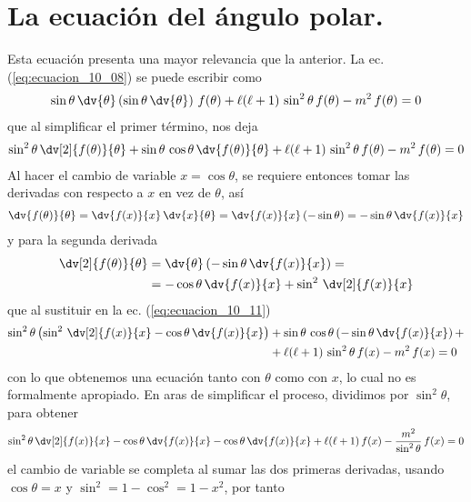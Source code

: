 \section{La ecuación del ángulo polar.}
Esta ecuación presenta una mayor relevancia que la anterior. La ec. (\ref{eq:ecuacion_10_08}) se puede escribir como
\begin{align*}
\sin \theta \, \dv{\theta} \left( \sin \theta \, \dv{\theta} \right) \, f(\theta) + \ell (\ell + 1) \, \sin^{2} \theta \, f(\theta) - m^{2} \, f(\theta) = 0
\end{align*}
que al simplificar el primer término, nos deja
\begin{align}
\sin^{2} \theta \, \dv[2]{f(\theta)}{\theta} + \sin \theta \, \cos \theta \, \dv{f(\theta)}{\theta} + \ell (\ell + 1) \, \sin^{2} \theta \, f(\theta) - m^{2} \, f(\theta) = 0
\label{eq:ecuacion_10_11}
\end{align}
Al hacer el cambio de variable $x = \cos \theta$, se requiere entonces tomar las derivadas con respecto a $x$ en vez de $\theta$, así
\begin{align*}
\dv{f(\theta)}{\theta} = \dv{f(x)}{x} \, \dv{x}{\theta} = \dv{f(x)}{x} \, (- \sin \theta) = -\sin \theta \, \dv{f(x)}{x}
\end{align*}
y para la segunda derivada
\begin{align*}
\dv[2]{f(\theta)}{\theta} &= \dv{\theta} \left( -\sin \theta \, \dv{f(x)}{x} \right) = \\
&= - \cos \theta \, \dv{f(x)}{x} + \sin^{2} \, \dv[2]{f(x)}{x}
\end{align*}
que al sustituir en la ec. (\ref{eq:ecuacion_10_11})
\begin{align*}
\sin^{2} \theta \left( \sin^{2} \, \dv[2]{f(x)}{x} - \cos \theta \, \dv{f(x)}{x} \right) &+ \sin \theta \, \cos \theta \left( - \sin \theta \, \dv{f(x)}{x} \right) + \\
&+ \ell (\ell + 1) \, \sin^{2} \theta \, f(x) - m^{2} \, f(x) = 0
\end{align*}
con lo que obtenemos una ecuación tanto con $\theta$ como con $x$, lo cual no es formalmente apropiado. En aras de simplificar el proceso, dividimos por $\sin^{2} \theta$, para obtener
\begin{align*}
\sin^{2} \theta \, \dv[2]{f(x)}{x} - \cos \theta \, \dv{f(x)}{x} - \cos \theta \, \dv{f(x)}{x} + \ell (\ell + 1) \, f(x) - \dfrac{m^{2}}{\sin^{2} \theta} \, f(x) = 0
\end{align*}
el cambio de variable se completa al sumar las dos primeras derivadas, usando $\cos \theta = x$ y $\sin^{2} = 1 - \cos^{2} = 1 - x^{2}$, por tanto
